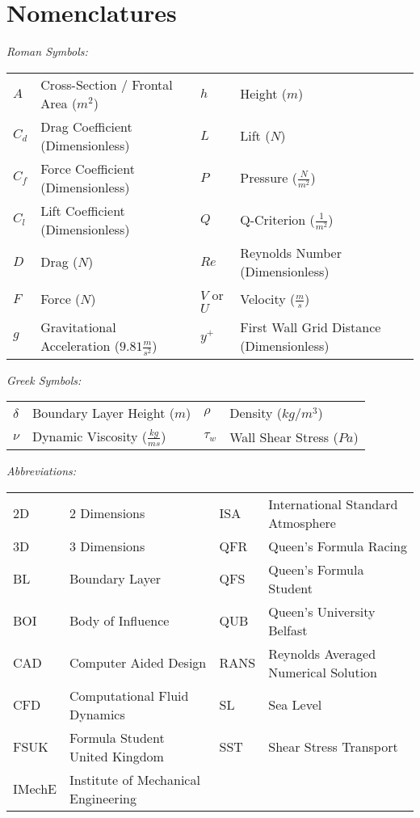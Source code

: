 \newpage
\thispagestyle{empty}
\section*{Nomenclatures} 
\flushleft
\begin{doublespace}

\textit{Roman Symbols:}

\begin{tabular}{l l l l }
$A$ & Cross-Section / Frontal Area ($m^2$) & $h$ & Height ($m$) \\
$C_d$ & Drag Coefficient (Dimensionless) & $L$ & Lift ($N$)\\
$C_f$ & Force Coefficient (Dimensionless)  & $P$ & Pressure ($\frac{N}{m^2}$)\\
$C_l$ & Lift Coefficient (Dimensionless) & $Q$ & Q-Criterion ($\frac{1}{m^2}$) \\
$D$ & Drag ($N$) & $Re$ & Reynolds Number (Dimensionless) \\
$F$ & Force ($N$)  & $V$ or $U$ & Velocity ($\frac{m}{s}$)\\
$g$ & Gravitational Acceleration ($9.81\frac{m}{s^2}$) & $y^+$ & First Wall Grid Distance (Dimensionless) \\
\end{tabular}


\textit{Greek Symbols:}

\begin{tabular}{l l l l }
$\delta$ & Boundary Layer Height ($m$) & $\rho$ & Density ($kg/m^3$) \\
$\nu$ & Dynamic Viscosity ($\frac{kg}{ms}$) & $\tau_w$ & Wall Shear Stress ($Pa$) \\
\end{tabular}

\textit{Abbreviations:}

\begin{tabular}{l l l l }
2D & 2 Dimensions & ISA & International Standard Atmosphere\\
3D & 3 Dimensions & QFR & Queen's Formula Racing\\
BL & Boundary Layer & QFS & Queen's Formula Student\\
BOI & Body of Influence & QUB & Queen's University Belfast\\
CAD & Computer Aided Design & RANS & Reynolds Averaged Numerical Solution\\
CFD & Computational Fluid Dynamics & SL & Sea Level\\
FSUK & Formula Student United Kingdom & SST & Shear Stress Transport\\
IMechE & Institute of Mechanical Engineering  & \\
\end{tabular}

\end{doublespace}